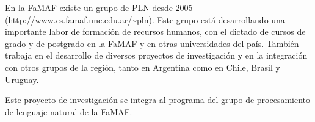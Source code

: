 En la FaMAF existe un grupo de PLN desde 2005 (\url{http://www.cs.famaf.unc.edu.ar/~pln}). Este
grupo est\'a desarrollando una importante labor de formaci\'on de recursos humanos, con el dictado 
de cursos de grado y de postgrado en la FaMAF y en otras universidades del pa\'is.
Tambi\'en trabaja en el desarrollo de diversos proyectos de investigaci\'on y en la integraci\'on
con otros grupos de la regi\'on, tanto en Argentina como en Chile, Brasil y Uruguay. 

Este proyecto 
de investigaci\'on se integra al programa del grupo de procesamiento de lenguaje natural de la
FaMAF.



